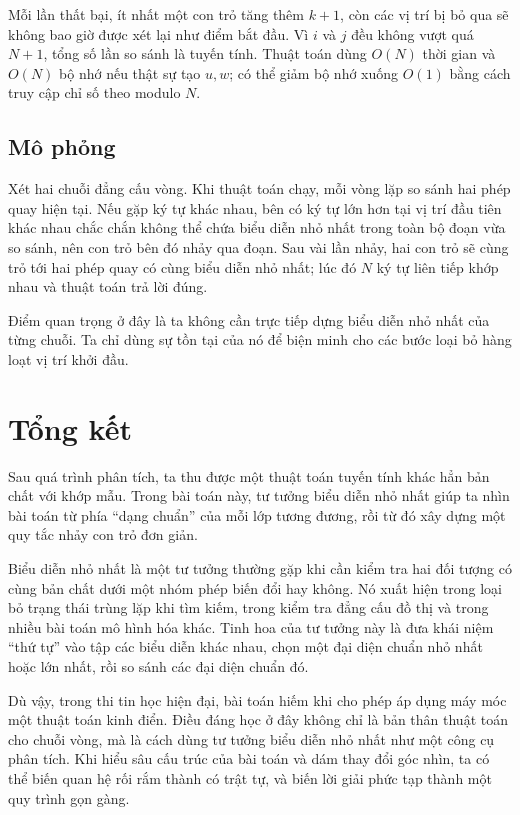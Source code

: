 \documentclass[11pt]{article}
\begin{document}
Mỗi lần thất bại, ít nhất một con trỏ tăng thêm \(k+1\), còn các vị trí bị bỏ
qua sẽ không bao giờ được xét lại như điểm bắt đầu. Vì \(i\) và \(j\) đều
không vượt quá \(N+1\), tổng số lần so sánh là tuyến tính. Thuật toán dùng
\(O(N)\) thời gian và \(O(N)\) bộ nhớ nếu thật sự tạo \(u,w\); có thể giảm bộ
nhớ xuống \(O(1)\) bằng cách truy cập chỉ số theo modulo \(N\).

\subsection{Mô phỏng}

Xét hai chuỗi đẳng cấu vòng. Khi thuật toán chạy, mỗi vòng lặp so sánh hai
phép quay hiện tại. Nếu gặp ký tự khác nhau, bên có ký tự lớn hơn tại vị trí
đầu tiên khác nhau chắc chắn không thể chứa biểu diễn nhỏ nhất trong toàn bộ
đoạn vừa so sánh, nên con trỏ bên đó nhảy qua đoạn. Sau vài lần nhảy, hai con
trỏ sẽ cùng trỏ tới hai phép quay có cùng biểu diễn nhỏ nhất; lúc đó \(N\) ký
tự liên tiếp khớp nhau và thuật toán trả lời đúng.

Điểm quan trọng ở đây là ta không cần trực tiếp dựng biểu diễn nhỏ nhất của
từng chuỗi. Ta chỉ dùng sự tồn tại của nó để biện minh cho các bước loại bỏ
hàng loạt vị trí khởi đầu.

\section{Tổng kết}

Sau quá trình phân tích, ta thu được một thuật toán tuyến tính khác hẳn bản
chất với khớp mẫu. Trong bài toán này, tư tưởng biểu diễn nhỏ nhất giúp ta
nhìn bài toán từ phía ``dạng chuẩn'' của mỗi lớp tương đương, rồi từ đó xây
dựng một quy tắc nhảy con trỏ đơn giản.

Biểu diễn nhỏ nhất là một tư tưởng thường gặp khi cần kiểm tra hai đối tượng
có cùng bản chất dưới một nhóm phép biến đổi hay không. Nó xuất hiện trong
loại bỏ trạng thái trùng lặp khi tìm kiếm, trong kiểm tra đẳng cấu đồ thị và
trong nhiều bài toán mô hình hóa khác. Tinh hoa của tư tưởng này là đưa
khái niệm ``thứ tự'' vào tập các biểu diễn khác nhau, chọn một đại diện chuẩn
nhỏ nhất hoặc lớn nhất, rồi so sánh các đại diện chuẩn đó.

Dù vậy, trong thi tin học hiện đại, bài toán hiếm khi cho phép áp dụng máy
móc một thuật toán kinh điển. Điều đáng học ở đây không chỉ là bản thân thuật
toán cho chuỗi vòng, mà là cách dùng tư tưởng biểu diễn nhỏ nhất như một công
cụ phân tích. Khi hiểu sâu cấu trúc của bài toán và dám thay đổi góc nhìn, ta
có thể biến quan hệ rối rắm thành có trật tự, và biến lời giải phức tạp thành
một quy trình gọn gàng.
\end{document}
